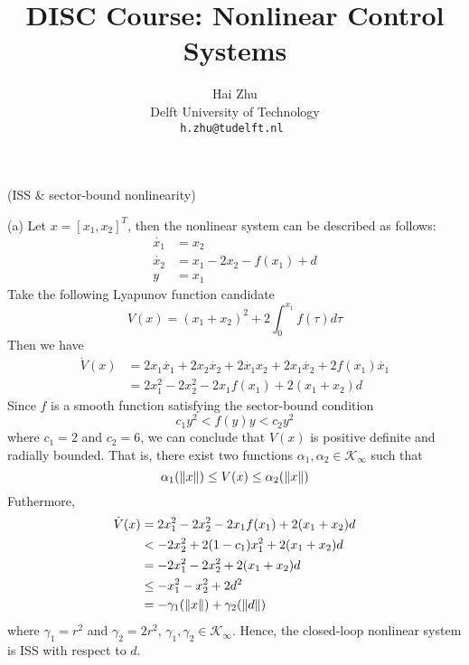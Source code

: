 \documentclass[a4 paper, 12pt]{article}
\title{
        \Large{DISC Course: Nonlinear Control Systems}\\
        \vspace{1em}
        \large\tb{Assignment 2}
}
\author{
        \small Hai Zhu                          \\
        \small Delft University of Technology   \\
        \tt\small h.zhu@tudelft.nl
 }
\date{\small\ti{Monday 19 February 2018}}
\begin{document}
\maketitle


 (ISS \& sector-bound nonlinearity)

 (a) Let $x = [x_1, x_2]^T$, then the nonlinear system can be described as follows:
\begin{equation}
        \begin{aligned}
                \dot{x_1} &= x_2 \\
                \dot{x_2} &= x_1 - 2x_2 -f(x_1) + d \\
                y &= x_1
        \end{aligned}
\end{equation}
Take the following Lyapunov function candidate
\begin{equation}
        V(x) = (x_1+x_2)^2 + 2\int_0^{x_1}f(\tau)d\tau
\end{equation} 
Then we have
\begin{equation}
        \begin{aligned}
                \dot{V}(x) &= 2x_1\dot{x_1} + 2x_2\dot{x_2} + 2\dot{x_1}x_2 + 2x_1\dot{x_2} + 2f(x_1)\dot{x_1} \\
                &= 2x_1^2 -2x_2^2 -2x_1f(x_1) + 2(x_1+x_2)d
        \end{aligned}
\end{equation}
Since $f$ is a smooth function satisfying the sector-bound condition
\begin{equation}
        c_1y^2 < f(y)y < c_2y^2
\end{equation} 
where $c_1=2$ and $c_2=6$, we can conclude that $V(x)$ is positive definite and radially bounded. That is, there exist two functions $\alpha_1,\alpha_2 \in \mathcal{K}_\infty$ such that
\begin{equation}
        \alpha_1(\left\|x\right\|) \leq V(x) \leq \alpha_2(\left\|x\right\|)
\end{equation}
Futhermore, 
\begin{equation}
        \begin{aligned}
                \dot{V}(x) &= 2x_1^2 -2x_2^2 -2x_1f(x_1) + 2(x_1+x_2)d \\
                &< -2x_2^2 + 2(1-c_1)x_1^2 + 2(x_1+x_2)d \\
                &= -2x_1^2 -2x_2^2 + 2(x_1+x_2)d \\
                &\leq -x_1^2 -x_2^2 + 2d^2 \\
                &= -\gamma_1(\left\|x\right\|) + \gamma_2(\left\|d\right\|)
        \end{aligned}
\end{equation}
where $\gamma_1 = r^2$ and $\gamma_2 = 2r^2$, $\gamma_1, \gamma_2 \in \mathcal{K}_\infty$. Hence, the closed-loop nonlinear system is ISS with respect to $d$.
\end{document}
